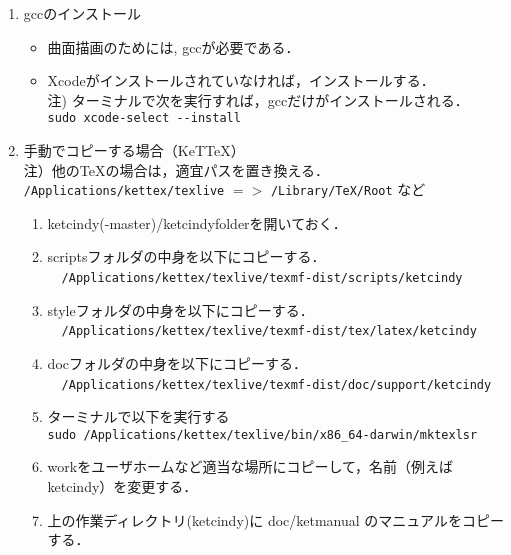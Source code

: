 \documentclass{ujarticle}
\begin{document}
\begin{enumerate}[\bf\large 1.]
\item gccのインストール
  \begin{itemize}
    \item 曲面描画のためには, gccが必要である．
    \item Xcodeがインストールされていなければ，インストールする．\\
    \hspace*{5mm}注) ターミナルで次を実行すれば，gccだけがインストールされる．\\
    \hspace*{20mm}\verb|sudo xcode-select --install|
  \end{itemize}

\item 手動でコピーする場合（KeTTeX）\\
\hspace*{1zw}注）他のTeXの場合は，適宜パスを置き換える．\\
\hspace*{3zw}\verb|/Applications/kettex/texlive| $=>$ \verb|/Library/TeX/Root| など
  \begin{enumerate}[(1)]
  \item ketcindy(-master)/ketcindyfolderを開いておく．
  \item scriptsフォルダの中身を以下にコピーする．\\
　\verb|/Applications/kettex/texlive/texmf-dist/scripts/ketcindy|
  \item styleフォルダの中身を以下にコピーする．\\
　\verb|/Applications/kettex/texlive/texmf-dist/tex/latex/ketcindy|
  \item docフォルダの中身を以下にコピーする．\\
　\verb|/Applications/kettex/texlive/texmf-dist/doc/support/ketcindy|
  \item ターミナルで以下を実行する\\
  \hspace*{1zw}\verb|sudo /Applications/kettex/texlive/bin/x86_64-darwin/mktexlsr|
  \item workをユーザホームなど適当な場所にコピーして，名前（例えばketcindy）を変更する．
  \item 上の作業ディレクトリ(ketcindy)に doc/ketmanual のマニュアルをコピーする．
  \end{enumerate}

\end{enumerate}
\end{document}
